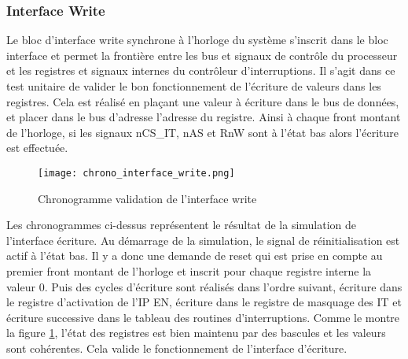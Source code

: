 \subsubsection{Interface Write}
Le bloc d'interface write synchrone à l'horloge du système s'inscrit dans le bloc interface et permet la frontière entre les bus et signaux de contrôle du processeur et les registres et signaux internes du contrôleur d'interruptions.
Il s'agit dans ce test unitaire de valider le bon fonctionnement de l'écriture de valeurs dans les registres.
Cela est réalisé en plaçant une valeur à écriture dans le bus de données, et placer dans le bus d'adresse l'adresse du registre.
Ainsi à chaque front montant de l'horloge, si les signaux nCS\_IT, nAS et RnW sont à l'état bas alors l'écriture est effectuée.
\begin{figure}[H]
	\centering
	\texttt{[image: chrono\_interface\_write.png]}
	\caption{Chronogramme validation de l'interface write}
	\label{fig:chrono_interface_write}
\end{figure}
Les chronogrammes ci-dessus représentent le résultat de la simulation de l'interface écriture.
Au démarrage de la simulation, le signal de réinitialisation est actif à l'état bas.
Il y a donc une demande de reset qui est prise en compte au premier front montant de l'horloge et inscrit pour chaque registre interne la valeur 0.
Puis des cycles d'écriture sont réalisés dans l'ordre suivant, écriture dans le registre d'activation de l'IP EN, écriture dans le registre de masquage des IT et écriture successive dans le tableau des routines d'interruptions.
Comme le montre la figure \ref{fig:chrono_interface_write}, l'état des registres est bien maintenu par des bascules et les valeurs sont cohérentes.
Cela valide le fonctionnement de l'interface d'écriture.

